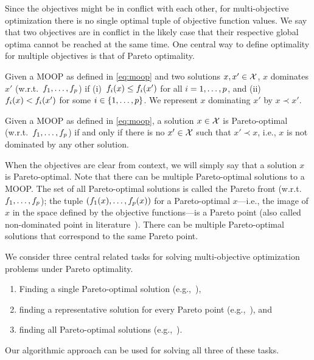 Since the objectives might be in conflict with each other, for multi-objective optimization there is no single optimal tuple of objective function values.
We say that two objectives are in conflict in the likely case that their respective global optima cannot be reached at the same time.
One central way to define optimality for multiple objectives is that of Pareto optimality.
\begin{definition}
  Given a MOOP as defined in \cref{eq:moop} and two solutions $x,x' \in \mathcal{X}$, $x$ dominates $x'$ (w.r.t.\ $f_1,\dots,f_p$) if (i)~$f_i(x) \leq f_i(x')$ for all $i=1,\dots,p$, and (ii)~$f_i(x) < f_i(x')$ for some $i\in\{1,\dots,p\}$.
  We represent $x$ dominating $x'$ by $x \prec x'$.
\end{definition}
\begin{definition}
  Given a MOOP as defined in \cref{eq:moop}, a solution $x \in \mathcal{X}$ is Pareto-optimal (w.r.t.\ $f_1,\dots,f_p$) if and only if there is no $x' \in \mathcal{X}$ such that $x' \prec x$, i.e., $x$ is not dominated by any other solution.
\end{definition}
When the objectives are clear from context, we will simply say that a solution $x$ is Pareto-optimal.
Note that there can be multiple Pareto-optimal solutions to a MOOP.
The set of all Pareto-optimal solutions is called the Pareto front (w.r.t.\ $f_1,\dots,f_p$);
the tuple $(f_1(x),\dots,f_p(x))$ for a Pareto-optimal $x$---i.e., the image of $x$ in the space defined by the objective functions---is a Pareto point (also called non-dominated point in literature~\autocite{Ehrgott2005-2}).
There can be multiple Pareto-optimal solutions that correspond to the same Pareto point.

We consider three central related tasks for solving multi-objective optimization problems under Pareto optimality.
\begin{enumerate}[label=(\roman*)]
  \item Finding a single Pareto-optimal solution (e.g.,~\autocite{Ehrgott2005-3}),
  \item finding a representative solution for every Pareto point (e.g.,~\autocite{DBLP:conf/cp/SohBTB17,DBLP:conf/cp/JanotaMSM21}), and
  \item finding all Pareto-optimal solutions (e.g.,~\autocite{Isermann1979enumerationallefficient}).
\end{enumerate}
Our algorithmic approach can be used for solving all three of these tasks.

